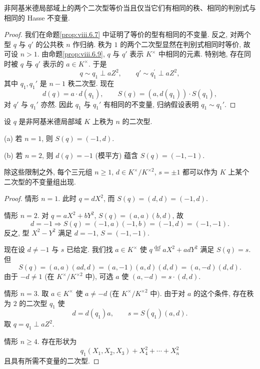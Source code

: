 \begin{theorem}\label{thm:viii.6.10}
非阿基米德局部域上的两个二次型等价当且仅当它们有相同的秩、相同的判别式与相同的 Hasse 不变量.
\end{theorem}

\begin{proof}
我们在命题\ref{prop:viii.6.7} 中证明了等价的型有相同的不变量. 反之, 对两个型 $q$ 与 $q'$ 的公共秩 $n$ 作归纳. 秩为 $1$ 的两个二次型显然在判别式相同时等价, 故可设 $n>1$. 由命题\ref{prop:viii.6.9}, $q$ 与 $q'$ 表示 $K^{\times}$ 中相同的元素. 特别地, 存在同时被 $q$ 与 $q'$ 表示的 $a\in K^{\times}$. 于是
\[
q\sim q_{1}\perp aZ^{2},\qquad q'\sim q_{1}^{\prime}\perp aZ^{2},
\]
其中 $q_1,q_1'$ 是 $n-1$ 秩二次型. 现在
\[
d(q)=a\cdot d(q_{1}),\qquad S(q)=(a,d(q_{1}))\cdot S(q_{1}),
\]
对 $q'$ 与 $q_1'$ 亦然. 因此 $q_1$ 与 $q_1'$ 有相同的不变量, 归纳假设表明 $q_1\sim q_1'$.
\end{proof}

\begin{proposition}\label{prop:viii.6.11}
设 $q$ 是非阿基米德局部域 $K$ 上秩为 $n$ 的二次型.

(a) 若 $n=1$, 则 $S(q)=(-1,d)$.

(b) 若 $n=2$, 则 $d(q)=-1$ (模平方) 蕴含 $S(q)=(-1,-1)$.

除这些限制之外, 每个三元组 $n\ge 1$, $d\in K^{\times}/K^{\times 2}$, $s=\pm 1$ 都可以作为 $K$ 上某个二次型的不变量组出现.
\end{proposition}

\begin{proof}
情形 $n=1$. 此时 $q=dX^{2}$, 而 $S(q)=(d,d)=(-1,d)$.

情形 $n=2$. 对 $q=aX^{2}+bY^{2}$, $S(q)=(a,a)(b,d)$, 故
\[
d=-1\Rightarrow S(q)=(-1,a)(-1,b)=(-1,d)=(-1,-1).
\]
反之, 型 $X^{2}-Y^{2}$ 满足 $d=-1$, $S=(-1,-1)$.

现在设 $d\ne -1$ 与 $s$ 已给定. 我们找 $a\in K^{\times}$ 使 $q\overset{\text{def}}{=}aX^{2}+adY^{2}$ 满足 $S(q)=s$. 但
\[
S(q)=(a,a)(ad,d)=(a,-1)(a,d)(d,d)=(a,-d)(d,d).
\]
由于 $-d\ne 1$ (在 $K^{\times}/K^{\times 2}$ 中), 可选 $a$ 使 $(a,-d)=s\cdot(d,d)$.

情形 $n=3$. 取 $a\in K^{\times}$ 使 $a\ne -d$ (在 $K^{\times}/K^{\times 2}$ 中). 由于对 $a$ 的这个条件, 存在秩为 $2$ 的二次型 $q_1$ 使
\[
d=d(q_{1})a,\qquad s=S(q_{1})(a,d).
\]
取 $q=q_1\perp aZ^{2}$.

情形 $n\ge 4$. 存在形状为
\[
q_{1}(X_{1},X_{2},X_{3})+X_{4}^{2}+\cdots+X_{n}^{2}
\]
且具有所需不变量的二次型.
\end{proof}


